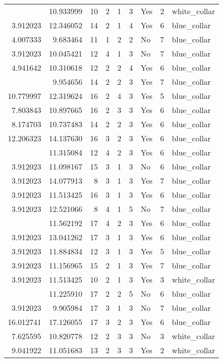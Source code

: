 \documentclass[
]{article}
\begin{document}
\begin{longtable}[t]{rrrrrllrl}
\addlinespace
3.912023 & 10.933999 & 10 & 2 & 1 & 3 & Yes & 2 & white\_collar\\
3.912023 & 12.346052 & 14 & 2 & 1 & 4 & Yes & 6 & blue\_collar\\
4.007333 & 9.683464 & 11 & 1 & 2 & 2 & No & 7 & blue\_collar\\
3.912023 & 10.045421 & 12 & 4 & 1 & 3 & No & 7 & blue\_collar\\
4.941642 & 10.310618 & 12 & 2 & 2 & 4 & Yes & 6 & blue\_collar\\
\addlinespace
9.215328 & 9.954656 & 14 & 2 & 2 & 3 & Yes & 7 & blue\_collar\\
10.779997 & 12.319624 & 16 & 2 & 4 & 3 & Yes & 5 & blue\_collar\\
7.803843 & 10.897665 & 16 & 2 & 3 & 3 & Yes & 6 & blue\_collar\\
8.174703 & 10.737483 & 14 & 2 & 2 & 3 & Yes & 6 & blue\_collar\\
12.206323 & 14.137630 & 16 & 3 & 2 & 3 & Yes & 6 & blue\_collar\\
\addlinespace
7.130899 & 11.315084 & 12 & 4 & 2 & 3 & Yes & 6 & blue\_collar\\
3.912023 & 11.098167 & 15 & 3 & 1 & 3 & No & 6 & blue\_collar\\
3.912023 & 14.077913 & 8 & 3 & 1 & 3 & Yes & 7 & blue\_collar\\
3.912023 & 11.513425 & 16 & 3 & 1 & 3 & Yes & 6 & blue\_collar\\
3.912023 & 12.521066 & 8 & 4 & 1 & 5 & No & 7 & blue\_collar\\
\addlinespace
8.527143 & 11.562192 & 17 & 4 & 2 & 3 & Yes & 6 & blue\_collar\\
3.912023 & 13.041262 & 17 & 3 & 1 & 3 & Yes & 6 & blue\_collar\\
3.912023 & 11.884834 & 12 & 3 & 1 & 3 & Yes & 5 & blue\_collar\\
3.912023 & 11.156965 & 15 & 2 & 1 & 3 & Yes & 7 & blue\_collar\\
3.912023 & 11.513425 & 10 & 2 & 1 & 3 & Yes & 3 & white\_collar\\
\addlinespace
12.611704 & 11.225910 & 17 & 2 & 2 & 5 & No & 6 & blue\_collar\\
3.912023 & 9.905984 & 17 & 3 & 1 & 3 & No & 7 & blue\_collar\\
16.012741 & 17.126055 & 17 & 3 & 2 & 3 & Yes & 6 & blue\_collar\\
7.625595 & 10.820778 & 12 & 2 & 3 & 3 & No & 3 & white\_collar\\
9.041922 & 11.051683 & 13 & 2 & 3 & 3 & Yes & 2 & white\_collar\\

\end{longtable}
\end{document}
